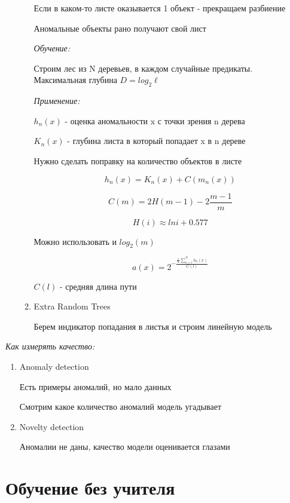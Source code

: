 \documentclass[a4paper, 12pt]{article}
\begin{document}
\begin{enumerate}
\begin{enumerate}
        Если в каком-то листе оказывается 1 объект - прекращаем
        разбиение

        Аномальные объекты рано получают свой лист

        \textit{Обучение:}

        Строим лес из N деревьев, в каждом 
        случайные предикаты. Максимальная глубина
        $D = log_2 \ell$

        \textit{Применение:}

        $h_n(x)$ - оценка аномальности x с точки зрения
        n дерева

        $K_n(x)$ - глубина листа в который попадает x в 
        n дереве

        Нужно сделать поправку на количество объектов в листе

        \[h_n(x) = K_n(x) + C(m_n(x))\]

        \[C(m) = 2H(m - 1) - 2\frac{m - 1}{m}\]

        \[H(i) \approx lni + 0.577\]

        Можно использовать и $log_2(m)$

        \[a(x) = 2^{-\frac{\frac{1}{N}\sum_{n = 1}^{N}h_n(x)}
        {C(l)}}\]

        $C(l)$ - средняя длина пути

        \item Extra Random Trees
        
        Берем индикатор попадания в листья 
        и строим линейную модель
    \end{enumerate}
\end{enumerate}

\textit{Как измерять качество:}

\begin{enumerate}
    \item Anomaly detection
    
    Есть примеры аномалий, но мало данных

    Смотрим какое количество аномалий модель угадывает

    \item Novelty detection
    
    Аномалии не даны, 
    качество модели оценивается глазами
\end{enumerate}

\section{Обучение без учителя}
\end{document}
